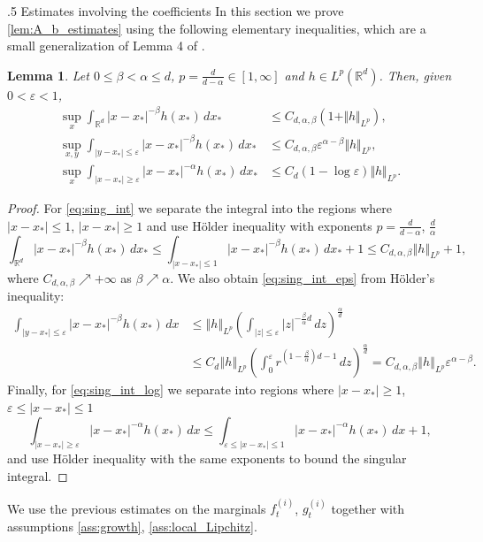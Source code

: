\documentclass[10pt,oneside]{amsart}
\makeatletter
\def\subsection{\@startsection{subsection}{2}%
  \z@{.5\linespacing\@plus.7\linespacing}
{.5\baselineskip}%
  {\normalfont\centering\scshape}%
}
\numberwithin{equation}{section}
\numberwithin{definition}{section}
\numberwithin{theorem}{section}
\newtheorem{lemma}{Lemma}
\numberwithin{lemma}{section}
\makeatother
\begin{document}
\subsection{Estimates involving the coefficients}\label{subsec:coeff_estimates}
In this section we prove \cref{lem:A_b_estimates} using the following elementary inequalities, which are a small generalization of Lemma 4 of \cite{fournier2010uniqueness_Coulomb}.
% 
\begin{lemma}\label{lem:sing_ints}
  Let $0\leq \beta <\alpha \leq d$, $p=\frac{d}{d-\alpha}\in [1,\infty]$ and $h\in L^{p}(\mathbb{R}^{d})$. Then, given $0<\varepsilon<1$,
  \begin{align}
    \sup_{x}\int_{\mathbb{R}^{d}}|x-x_{*}|^{-\beta}h(x_{*})\,dx_{*}&
    \leq C_{d,\alpha,\beta}\left(1+\Vert h\Vert _{L^{p}}\right),\label{eq:sing_int}\\
    \sup_{x,y}\int_{|y-x_{*}|\leq\varepsilon}|x-x_{*}|^{-\beta}h(x_{*})\,dx_{*}&
    \le C_{d,\alpha,\beta}\varepsilon^{\alpha-\beta}\Vert h\Vert _{L^{p}},\label{eq:sing_int_eps}\\
    \sup_{x}\int_{|x-x_{*}|\geq\varepsilon}|x-x_{*}|^{-\alpha}h(x_{*})\,dx_{*}&
    \leq C_{d}\left(1-\log\varepsilon\right)\Vert h\Vert _{L^{p}}.\label{eq:sing_int_log}
  \end{align}
\end{lemma}
% 
\begin{proof}
  For \eqref{eq:sing_int} we separate the integral into the regions where $|x-x_{*}|\leq1$, $|x-x_{*}|\geq1$ and use Hölder inequality with exponents $p=\frac{d}{d-\alpha}$, $\frac{d}{\alpha}$
  \begin{equation*}
    \int_{\mathbb{R}^{d}}|x-x_{*}|^{-\beta}h(x_{*})\,dx_{*}
    \leq\int_{|x-x_{*}|\le1}|x-x_{*}|^{-\beta}h(x_{*})\,dx_{*}+1
    \leq C_{d,\alpha,\beta}\left\Vert h\right\Vert _{L^{p}}+1,
  \end{equation*}
  where $C_{d,\alpha,\beta}\nearrow+\infty$ as $\beta \nearrow\alpha$. We also obtain \eqref{eq:sing_int_eps} from Hölder's inequality:
  \begin{align*}
    \int_{|y-x_*|\leq \varepsilon}|x-x_{*}|^{-\beta}h(x_{*})\,dx &
    \leq\left\Vert h\right\Vert _{L^{p}}\left(\int_{|z|\leq\varepsilon}|z|^{-\frac{\beta}{\alpha}d}\,dz\right)^{\frac{\alpha}{d}}	\\
    & \leq C_{d}\left\Vert h\right\Vert _{L^{p}}\left(\int_{0}^{\varepsilon}r^{\left(1-\frac{\beta}{\alpha}\right)d-1}\,dz\right)^{\frac{\alpha}{d}}
    =C_{d,\alpha,\beta}\left\Vert h\right\Vert _{L^{p}}\varepsilon^{\alpha-\beta}.
  \end{align*}
  Finally, for \eqref{eq:sing_int_log} we separate into regions where $|x-x_*|\geq 1$, $\varepsilon \leq |x-x_*|\leq 1$
  \begin{equation*}
    \int_{|x-x_{*}|\geq\varepsilon}|x-x_{*}|^{-\alpha}h(x_{*})\,dx\leq\int_{\varepsilon\leq|x-x_{*}|\leq1}|x-x_{*}|^{-\alpha}h(x_{*})\,dx+1,
  \end{equation*}
  and use Hölder inequality with the same exponents to bound the singular integral.
\end{proof}
% 
We use the previous estimates on the marginals $f_t^{(i)}$, $g_t^{(i)}$ together with assumptions \ref{ass:growth}, \ref{ass:local_Lipchitz}.
\end{document}
